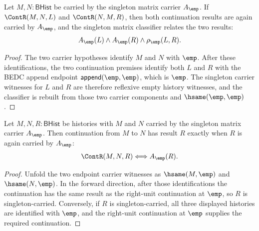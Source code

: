 \begin{theorem}
\label{thm:matrix-singleton-classifier-continuation-comm-closed}
Let $M,N:\mathsf{BHist}$ be carried by the singleton matrix carrier
$A_{\emp}$. If $\ContR(M,N,L)$ and $\ContR(N,M,R)$, then both continuation
results are again carried by $A_{\emp}$, and the singleton matrix classifier
relates the two results:
$$
A_{\emp}(L)\land A_{\emp}(R)\land \rho_{\emp}(L,R).
$$
\end{theorem}
\begin{proof}
The two carrier hypotheses identify $M$ and $N$ with $\emp$. After these
identifications, the two continuation premises identify both $L$ and $R$ with
the BEDC append endpoint $\mathsf{append}(\emp,\emp)$, which is $\emp$. The
singleton carrier witnesses for $L$ and $R$ are therefore reflexive empty
history witnesses, and the classifier is rebuilt from those two carrier
components and $\hsame(\emp,\emp)$.
\end{proof}

\begin{theorem}
\label{thm:matrix-singleton-carrier-continuation-result-iff}
Let $M,N,R:\mathsf{BHist}$ be histories with $M$ and $N$ carried by the
singleton matrix carrier $A_{\emp}$. Then continuation from $M$ to $N$ has
result $R$ exactly when $R$ is again carried by $A_{\emp}$:
$$
\ContR(M,N,R)\Longleftrightarrow A_{\emp}(R).
$$
\end{theorem}
\begin{proof}
Unfold the two endpoint carrier witnesses as $\hsame(M,\emp)$ and
$\hsame(N,\emp)$. In the forward direction, after those identifications the
continuation has the same result as the right-unit continuation at $\emp$, so
$R$ is singleton-carried. Conversely, if $R$ is singleton-carried, all three
displayed histories are identified with $\emp$, and the right-unit
continuation at $\emp$ supplies the required continuation.
\end{proof}

